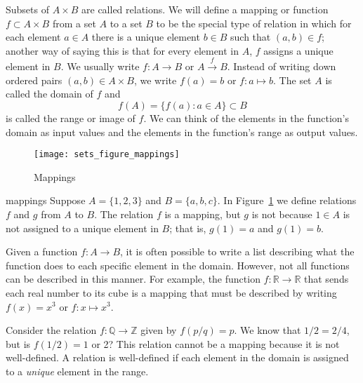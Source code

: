 Subsets of $A \times B$ are called {\bfi relations}.  We will define a  {\bfi mapping\/} or {\bfi function} $f \subset A \times B$ from a set $A$ to a set $B$ to be the special type of  relation in which for each element $a \in A$ there is a unique element $b \in B$ such that $(a, b) \in f$; another way of saying this is that for every element in $A$, $f$ assigns a unique element in $B$.  We usually write $f:A \rightarrow B$ or $A \stackrel{f}{\rightarrow} B$.  Instead of writing down ordered pairs  $(a,b) \in A \times B$, we write $f(a) = b$ or $f : a \mapsto b$.  The set  $A$ is called the {\bfi domain\/} of $f$ and   
$$
f(A) = \{ f(a) : a \in A \} \subset B
$$
is called the {\bfi range\/} or {\bfi image\/} of $f$.  We can think of the elements in the function's domain as input values and the elements in the function's range as output values.  
 
\begin{figure}[htb]
\begin{center}
\centerline {
\texttt{[image: sets\_figure\_mappings]}
}
\end{center}
\caption{Mappings}
\label{sets_figure_mappings}
\end{figure}

\begin{example}{mappings}
Suppose $A = \{1, 2, 3 \}$ and $B = \{a, b, c \}$.  In Figure~\ref{sets_figure_mappings} we define relations $f$ and  $g$ from $A$ to $B$.  The relation $f$ is a mapping, but $g$ is not because $1 \in A$ is not assigned to a unique element in $B$; that is, $g(1) = a$ and $g(1) = b$.  
\end{example}

Given a function $f : A \rightarrow B$, it is often possible to write a list describing what the function does to each specific element in the domain.  However, not all functions can be described in this manner.  For example, the function $f: {\mathbb R} \rightarrow {\mathbb R}$ that sends each real number to its cube is a mapping that must be described by writing $f(x) = x^3$ or $f:x \mapsto x^3$. 
 
Consider the relation $f : {\mathbb Q} \rightarrow {\mathbb Z}$ given by $f(p/q) = p$.  We know that $1/2 = 2/4$, but is $f(1/2) = 1$ or 2?  This relation cannot be a mapping because it is not well-defined.  A relation is {\bfi well-defined\/} if each element in the domain is assigned to a {\em unique\/} element in the range. 

